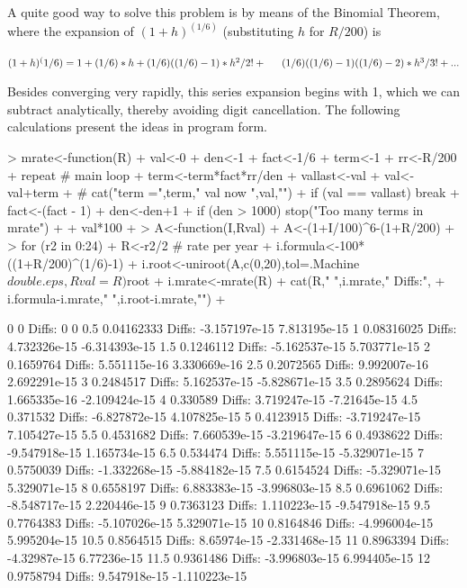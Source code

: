 \documentclass[11pt,letterpaper]{article}
\begin{document}
A quite good way to solve this problem is by means of the Binomial Theorem, where the
expansion of $(1+h)^(1/6)$ (substituting $h$ for $R/200$) is 

\noindent
$  (1+h)^(1/6) = 1 + (1/6)*h +(1/6)((1/6) - 1)*h^2/2! +\\
  \indent (1/6)((1/6)-1)((1/6)-2)*h^3/3! + ...$

Besides converging very rapidly, this series expansion begins with 1, which we can 
subtract analytically, thereby avoiding digit cancellation. The following calculations
present the ideas in program form.

\begin{Schunk}
\begin{Sinput}
> mrate<-function(R){
+    val<-0
+    den<-1
+    fact<-1/6
+    term<-1
+    rr<-R/200
+    repeat { # main loop
+       term<-term*fact*rr/den
+       vallast<-val
+       val<-val+term
+ #      cat("term =",term,"  val now ",val,"\n")
+       if (val == vallast) break
+       fact<-(fact - 1)
+       den<-den+1
+       if (den > 1000) stop("Too many terms in mrate")
+    }
+    val*100
+ }
> A<-function(I,Rval){
+    A<-(1+I/100)^6-(1+R/200)
+ }
> for (r2 in 0:24){
+    R<-r2/2 # rate per year
+    i.formula<-100*((1+R/200)^(1/6)-1)
+    i.root<-uniroot(A,c(0,20),tol=.Machine$double.eps,Rval=R)$root
+    i.mrate<-mrate(R)
+    cat(R,"   ",i.mrate,"   Diffs:",
+          i.formula-i.mrate,"  ",i.root-i.mrate,"\n")
+ }
\end{Sinput}
\begin{Soutput}
0     0    Diffs: 0    0 
0.5     0.04162333    Diffs: -3.157197e-15    7.813195e-15 
1     0.08316025    Diffs: 4.732326e-15    -6.314393e-15 
1.5     0.1246112    Diffs: -5.162537e-15    5.703771e-15 
2     0.1659764    Diffs: 5.551115e-16    3.330669e-16 
2.5     0.2072565    Diffs: 9.992007e-16    2.692291e-15 
3     0.2484517    Diffs: 5.162537e-15    -5.828671e-15 
3.5     0.2895624    Diffs: 1.665335e-16    -2.109424e-15 
4     0.330589    Diffs: 3.719247e-15    -7.21645e-15 
4.5     0.371532    Diffs: -6.827872e-15    4.107825e-15 
5     0.4123915    Diffs: -3.719247e-15    7.105427e-15 
5.5     0.4531682    Diffs: 7.660539e-15    -3.219647e-15 
6     0.4938622    Diffs: -9.547918e-15    1.165734e-15 
6.5     0.534474    Diffs: 5.551115e-15    -5.329071e-15 
7     0.5750039    Diffs: -1.332268e-15    -5.884182e-15 
7.5     0.6154524    Diffs: -5.329071e-15    5.329071e-15 
8     0.6558197    Diffs: 6.883383e-15    -3.996803e-15 
8.5     0.6961062    Diffs: -8.548717e-15    2.220446e-15 
9     0.7363123    Diffs: 1.110223e-15    -9.547918e-15 
9.5     0.7764383    Diffs: -5.107026e-15    5.329071e-15 
10     0.8164846    Diffs: -4.996004e-15    5.995204e-15 
10.5     0.8564515    Diffs: 8.65974e-15    -2.331468e-15 
11     0.8963394    Diffs: -4.32987e-15    6.77236e-15 
11.5     0.9361486    Diffs: -3.996803e-15    6.994405e-15 
12     0.9758794    Diffs: 9.547918e-15    -1.110223e-15 
\end{Soutput}
\end{Schunk}
\end{document}
